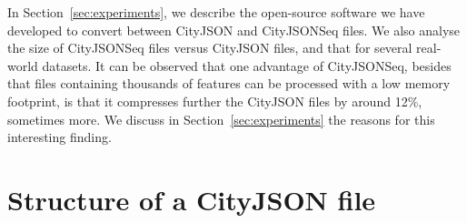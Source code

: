 \documentclass{isprs} %
\begin{document}
%

In Section~\ref{sec:experiments}, we describe  the open-source software we have developed to convert between CityJSON and CityJSONSeq files.
We also analyse the size of CityJSONSeq files versus CityJSON files, and that for several real-world datasets.
It can be observed that one advantage of CityJSONSeq, besides that files containing thousands of features can be processed with a low memory footprint, is that it compresses further the CityJSON files by around 12\%, sometimes more.
We discuss in Section~\ref{sec:experiments} the reasons for this interesting finding.


%
\section{Structure of a CityJSON file}%
\label{sec:cityjson}
\end{document}
